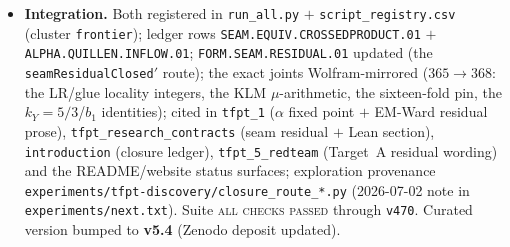 \documentclass[11pt]{article}
\providecommand{\mE}{\textbf{[E]}}\providecommand{\mC}{\textbf{[C]}}
\providecommand{\mO}{\textbf{[O]}}\providecommand{\mX}{\textbf{[X]}}
\begin{document}
\begin{itemize}
\texttt{SEAM.EQUIV.01}/S3) and $C{=}1$ ($U(1)$, feeds EM1) --- so closing R1$'$ feeds \emph{both}
named targets. \mO\ \emph{not closed}: the bridge lemma ``$\delta\log\det_\zeta(\mathrm{seam}){=}$
the inflow response'' stays the named cited step; \texttt{ALPHA.QUILLEN.EXACT.01} stays \mO;
$\ainv$ stays \mE.
\item \textbf{Integration.} Both registered in \texttt{run\_all.py} $+$
\texttt{script\_registry.csv} (cluster \texttt{frontier}); ledger rows
\texttt{SEAM.EQUIV.CROSSEDPRODUCT.01} $+$ \texttt{ALPHA.QUILLEN.INFLOW.01};
\texttt{FORM.SEAM.RESIDUAL.01} updated (the \texttt{seamResidualClosed$'$} route); the exact joints
Wolfram-mirrored ($365\to368$: the LR/glue locality integers, the KLM $\mu$-arithmetic, the
sixteen-fold pin, the $k_Y{=}5/3$/$b_1$ identities); cited in \texttt{tfpt\_1} ($\alpha$ fixed point
$+$ EM-Ward residual prose), \texttt{tfpt\_research\_contracts} (seam residual $+$ Lean section),
\texttt{introduction} (closure ledger), \texttt{tfpt\_5\_redteam} (Target~A residual wording) and
the README/website status surfaces; exploration provenance
\texttt{experiments/tfpt-discovery/closure\_route\_*.py} (2026-07-02 note in
\texttt{experiments/next.txt}). Suite \textsc{all checks passed} through \texttt{v470}.
Curated version bumped to \textbf{v5.4} (Zenodo deposit updated).
\end{itemize}
\end{document}
